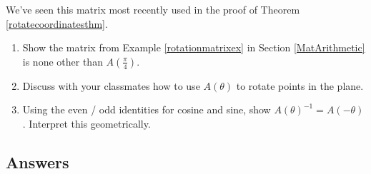 \documentclass{ximera}
\begin{document}
 \smallskip
 
 We've seen this matrix most recently  used in the proof of Theorem \ref{rotatecoordinatesthm}.

\begin{enumerate}
\setcounter{enumi}{\value{HW}}
\item  Show the matrix from Example \ref{rotationmatrixex} in Section \ref{MatArithmetic} is none other than $A\left(\frac{\pi}{4}\right)$.

\item  Discuss with your classmates how to use $A(\theta)$ to rotate points in the plane.

\item  Using the even / odd identities for cosine and sine,  show $A(\theta)^{-1} = A(-\theta)$.  Interpret this geometrically.



\end{enumerate}

\newpage

\subsection{Answers}
\end{document}
